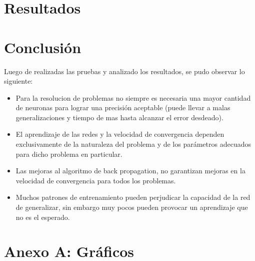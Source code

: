 \documentclass[%
    final,
    reprint,
    notitlepage,
    narroweqnarray,
    inline,
    twoside,
    invited
    ]{ieee}
\begin{document}
\section{Resultados}

\par 


\section{Conclusión}

Luego de realizadas las pruebas y analizado los resultados, se pudo observar lo siguiente:\\
\begin{itemize}
\item Para la resolucion de problemas no siempre es necesaria una mayor cantidad de neuronas para lograr una precisión aceptable (puede llevar a malas generalizaciones y tiempo de mas hasta alcanzar el error desdeado). \\
\item El aprendizaje de las redes y la velocidad de convergencia dependen exclusivamente de la naturaleza del problema y de los parámetros adecuados para dicho problema en particular.\\
\item Las mejoras al algoritmo de back propagation, no garantizan mejoras en la velocidad de convergencia para todos los problemas.\\
\item Muchos patrones de entrenamiento pueden perjudicar la capacidad de la red de generalizar, sin embargo muy pocos pueden provocar un aprendizaje que no es el esperado.\\
\end{itemize}



\clearpage
\onecolumn

\section*{Anexo A: Gráficos}
\end{document}
